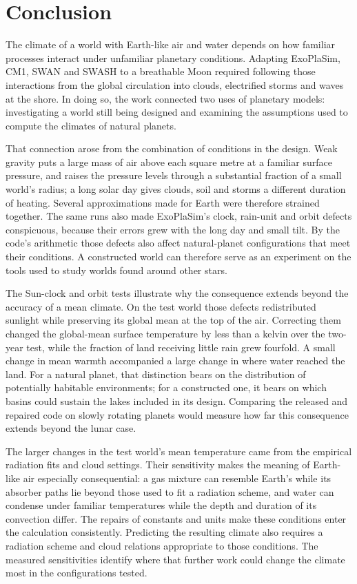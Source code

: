 \section{Conclusion}

The climate of a world with Earth-like air and water depends on how familiar processes interact under unfamiliar
planetary conditions. Adapting ExoPlaSim, CM1, SWAN and SWASH to a breathable Moon required following those
interactions from the global circulation into clouds, electrified storms and waves at the shore. In doing so,
the work connected two uses of planetary models: investigating a world still being designed and examining the
assumptions used to compute the climates of natural planets.

That connection arose from the combination of conditions in the design. Weak gravity puts a large mass of air
above each square metre at a familiar surface pressure, and raises the pressure levels through a substantial
fraction of a small world's radius; a long solar day gives clouds, soil and storms a different duration of
heating. Several approximations made for Earth were therefore strained together. The same runs also made
ExoPlaSim's clock, rain-unit and orbit defects conspicuous, because their errors grew with the long day and small
tilt. By the code's arithmetic those defects also affect natural-planet configurations that meet their
conditions. A constructed world can therefore serve as an experiment on the tools used to study worlds found
around other stars.

The Sun-clock and orbit tests illustrate why the consequence extends beyond the accuracy of a mean climate.
On the test world those defects redistributed sunlight while preserving its global mean at the top of the air.
Correcting them changed the global-mean surface temperature by less than a kelvin over the two-year test, while
the fraction of land receiving little rain grew fourfold. A small change in mean warmth accompanied a large
change in where water reached the land. For a natural planet, that distinction bears on the distribution of
potentially habitable environments; for a constructed one, it bears on which basins could sustain the lakes
included in its design. Comparing the released and repaired code on slowly rotating planets would measure how
far this consequence extends beyond the lunar case.

The larger changes in the test world's mean temperature came from the empirical radiation fits and cloud
settings. Their sensitivity makes the meaning of Earth-like air especially consequential: a gas mixture can
resemble Earth's while its absorber paths lie beyond those used to fit a radiation scheme, and water can
condense under familiar temperatures while the depth and duration of its convection differ. The repairs of
constants and units make these conditions enter the calculation consistently. Predicting the resulting climate
also requires a radiation scheme and cloud relations appropriate to those conditions. The measured
sensitivities identify where that further work could change the climate most in the configurations tested.

